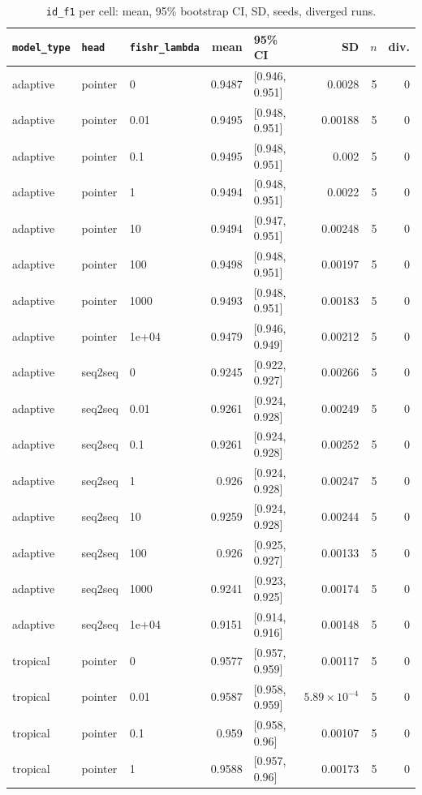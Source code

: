 \documentclass[10pt]{article}
\begin{document}
{\small
\begin{longtable}{lllrlrrr}
\caption{\texttt{id\_f1} per cell: mean, 95\% bootstrap CI, SD, seeds, diverged runs.}\label{tab:summary-id_f1}\\
\toprule
\texttt{model\_type} & \texttt{head} & \texttt{fishr\_lambda} & mean & 95\% CI & SD & $n$ & div.\\
\midrule
\endhead
adaptive & pointer & 0 & 0.9487 & [0.946, 0.951] & 0.0028 & 5 & 0\\
adaptive & pointer & 0.01 & 0.9495 & [0.948, 0.951] & 0.00188 & 5 & 0\\
adaptive & pointer & 0.1 & 0.9495 & [0.948, 0.951] & 0.002 & 5 & 0\\
adaptive & pointer & 1 & 0.9494 & [0.948, 0.951] & 0.0022 & 5 & 0\\
adaptive & pointer & 10 & 0.9494 & [0.947, 0.951] & 0.00248 & 5 & 0\\
adaptive & pointer & 100 & 0.9498 & [0.948, 0.951] & 0.00197 & 5 & 0\\
adaptive & pointer & 1000 & 0.9493 & [0.948, 0.951] & 0.00183 & 5 & 0\\
adaptive & pointer & 1e+04 & 0.9479 & [0.946, 0.949] & 0.00212 & 5 & 0\\
adaptive & seq2seq & 0 & 0.9245 & [0.922, 0.927] & 0.00266 & 5 & 0\\
adaptive & seq2seq & 0.01 & 0.9261 & [0.924, 0.928] & 0.00249 & 5 & 0\\
adaptive & seq2seq & 0.1 & 0.9261 & [0.924, 0.928] & 0.00252 & 5 & 0\\
adaptive & seq2seq & 1 & 0.926 & [0.924, 0.928] & 0.00247 & 5 & 0\\
adaptive & seq2seq & 10 & 0.9259 & [0.924, 0.928] & 0.00244 & 5 & 0\\
adaptive & seq2seq & 100 & 0.926 & [0.925, 0.927] & 0.00133 & 5 & 0\\
adaptive & seq2seq & 1000 & 0.9241 & [0.923, 0.925] & 0.00174 & 5 & 0\\
adaptive & seq2seq & 1e+04 & 0.9151 & [0.914, 0.916] & 0.00148 & 5 & 0\\
tropical & pointer & 0 & 0.9577 & [0.957, 0.959] & 0.00117 & 5 & 0\\
tropical & pointer & 0.01 & 0.9587 & [0.958, 0.959] & $5.89\times10^{-4}$ & 5 & 0\\
tropical & pointer & 0.1 & 0.959 & [0.958, 0.96] & 0.00107 & 5 & 0\\
tropical & pointer & 1 & 0.9588 & [0.957, 0.96] & 0.00173 & 5 & 0\\

\end{longtable}}
\end{document}
